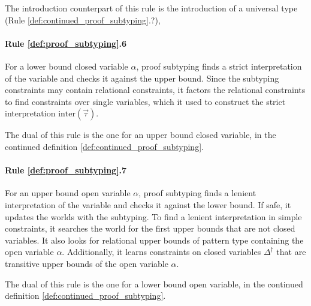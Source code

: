 \documentclass[acmsmall]{acmart}
\theoremstyle{definition}
\begin{document}


The introduction counterpart of this rule is the introduction of a universal type (Rule \ref{def:continued_proof_subtyping}.?), 


\paragraph{Rule \ref{def:proof_subtyping}.6}
For a lower bound closed variable $\alpha$, proof subtyping
finds a strict interpretation of the variable
and checks it against the upper bound. Since the subtyping constraints
may contain relational constraints, it factors the relational constraints
to find constraints over single variables, which it used to construct the strict
interpretation $\text{inter}(\vec{\tau})$.  

The dual of this rule is the one for an upper bound closed variable, 
in the continued definition \ref{def:continued_proof_subtyping}.

\paragraph{Rule \ref{def:proof_subtyping}.7}
For an upper bound open variable $\alpha$, proof subtyping
finds a lenient interpretation of the variable and checks it against the lower bound.
If safe, it updates the worlds with the subtyping.
To find a lenient interpretation in simple constraints, it searches the world for 
the first upper bounds that are not closed variables. It also looks for relational
upper bounds of pattern type containing the open variable $\alpha$.
Additionally, it learns constraints on closed variables $\Delta^\dagger$ 
that are transitive upper bounds of the open variable $\alpha$.  

The dual of this rule is the one for a lower bound open variable, 
in the continued definition \ref{def:continued_proof_subtyping}.
\end{document}
